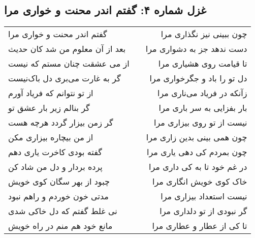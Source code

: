 \begin{center}
\section*{غزل شماره ۴: گفتم اندر محنت و خواری مرا}
\label{sec:004}
\begin{longtable}{l p{0.5cm} r}
گفتم اندر محنت و خواری مرا
&&
چون ببینی نیز نگذاری مرا
\\
بعد از آن معلوم من شد کان حدیث
&&
دست ندهد جز به دشواری مرا
\\
از می عشقت چنان مستم که نیست
&&
تا قیامت روی هشیاری مرا
\\
گر به غارت می‌بری دل باک‌نیست
&&
دل تو را باد و جگرخواری مرا
\\
از تو نتوانم که فریاد آورم
&&
زآنکه در فریاد می‌ناری مرا
\\
گر بنالم زیر بار عشق تو
&&
بار بفزایی به سر باری مرا
\\
گر زمن بیزار گردد هرچه هست
&&
نیست از تو روی بیزاری مرا
\\
از من بیچاره بیزاری مکن
&&
چون همی بینی بدین زاری مرا
\\
گفته بودی کاخرت یاری دهم
&&
چون بمردم کی دهی یاری مرا
\\
پرده بردار و دل من شاد کن
&&
در غم خود تا به کی داری مرا
\\
چبود از بهر سگان کوی خویش
&&
خاک کوی خویش انگاری مرا
\\
مدتی خون خوردم و راهم نبود
&&
نیست استعداد بیزاری مرا
\\
نی غلط گفتم که دل خاکی شدی
&&
گر نبودی از تو دلداری مرا
\\
مانع خود هم منم در راه خویش
&&
تا کی از عطار و عطاری مرا
\\
\end{longtable}
\end{center}
